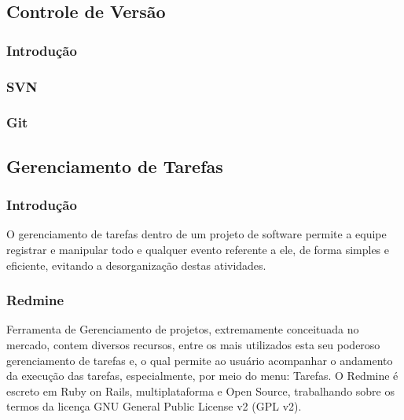 \documentclass[12pt,a4paper]{article}
\begin{document}
	\subsection{Controle de Versão}
		\subsubsection{Introdução}
		\subsubsection{SVN}
		\subsubsection{Git}
		
	\subsection{Gerenciamento de Tarefas}
		\subsubsection{Introdução}
			O gerenciamento de tarefas dentro de um projeto de software permite a equipe registrar e manipular todo e qualquer evento referente a ele, de forma simples e eficiente, evitando a desorganização destas atividades. 
		
		
		\subsubsection{Redmine}
			
			Ferramenta de Gerenciamento de projetos, extremamente conceituada no mercado, contem diversos recursos, entre os mais utilizados esta seu poderoso gerenciamento de tarefas e, o qual permite ao usuário acompanhar o andamento da  execução das tarefas, especialmente, por meio do menu: Tarefas.
			O Redmine é escreto em Ruby on Rails, multiplataforma e Open Source, trabalhando sobre os termos da licença GNU General Public License v2 (GPL v2).
		
\end{document}
